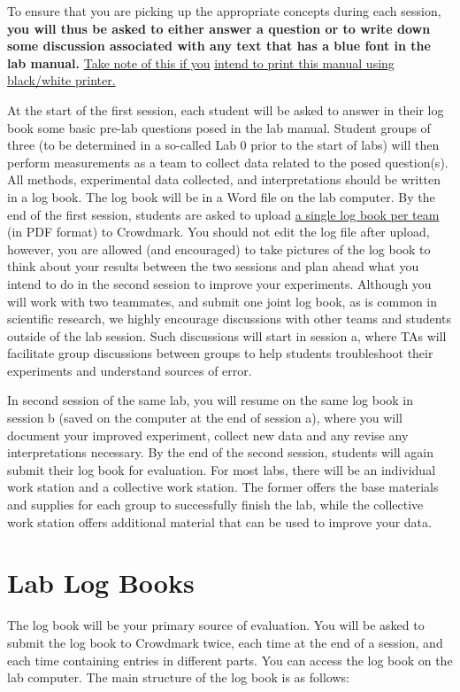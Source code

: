 \documentclass[12pt]{report}
\begin{document}
To ensure that you are picking up the appropriate concepts during each session, 
\textbf{ {\color{blue}  you will thus be asked to either answer a question or to write down some discussion associated with any text that has a blue font in the lab manual.}} \underline{Take note of this if you} \underline{intend to print this manual using black/white printer.}

At the start of the first session, each student will be asked to answer in their log book some basic pre-lab questions posed in the lab manual. Student groups of three (to be determined in a so-called Lab 0 prior to the start of labs) will then perform measurements as a team to collect data related to the posed question(s). 
All methods, experimental data collected, and interpretations should be written in a log book. 
The log book will be in a Word file on the lab computer. By the end of the first session, students are asked to upload \underline{a single log book per team} (in PDF format) to Crowdmark. You should not edit the log file after upload, however, you are allowed (and encouraged) to take pictures of the log book to think about your results between the two sessions and plan ahead what you intend to do in the second session to improve your experiments. 
Although you will work with two teammates, and submit one joint log book, as is common in scientific research, we highly encourage discussions with other teams and students outside of the lab session. Such discussions will start in session a, where TAs will facilitate group discussions between groups to help students troubleshoot their experiments and understand sources of error. 

In second session of the same lab, you will resume on the same log book in session b (saved on the computer at the end of session a), where you will document your improved experiment, collect new data and any revise any interpretations necessary. 
By the end of the second session, students will again submit their log book for evaluation. For most labs, there will be an individual work station and a collective work station. The former offers the base materials and supplies for each group to successfully finish the lab, while the collective work station offers additional material that can be used to improve your data.

\section{Lab Log Books}
The log book will be your primary source of evaluation. You will be asked to submit the log book to Crowdmark twice, each time at the end of a session, and each time containing entries in different parts. You can access the log book on the lab computer. The main structure of the log book is as follows:\\
 
\end{document}
